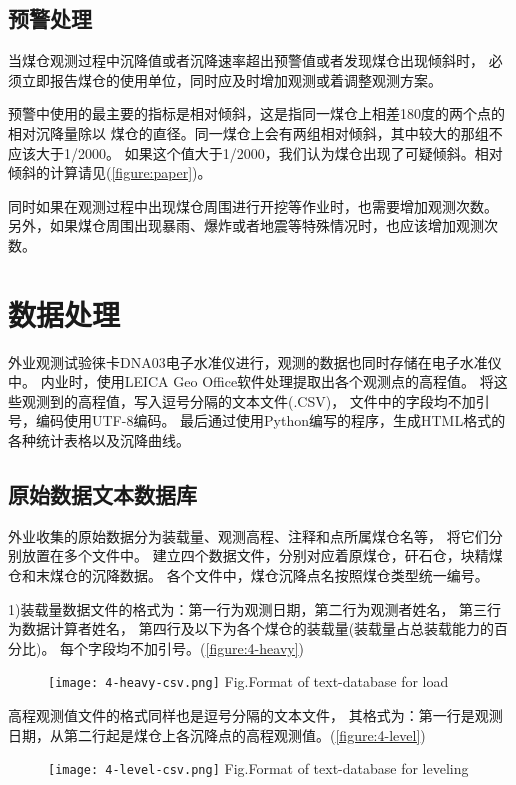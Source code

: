 \subsection{预警处理}
当煤仓观测过程中沉降值或者沉降速率超出预警值或者发现煤仓出现倾斜时，
必须立即报告煤仓的使用单位，同时应及时增加观测或着调整观测方案。

预警中使用的最主要的指标是相对倾斜，这是指同一煤仓上相差180度的两个点的相对沉降量除以
煤仓的直径。同一煤仓上会有两组相对倾斜，其中较大的那组不应该大于1/2000。
如果这个值大于1/2000，我们认为煤仓出现了可疑倾斜。相对倾斜的计算请见(\ref{figure:paper})。

同时如果在观测过程中出现煤仓周围进行开挖等作业时，也需要增加观测次数。
另外，如果煤仓周围出现暴雨、爆炸或者地震等特殊情况时，也应该增加观测次数。


\section{数据处理}
外业观测试验徕卡DNA03电子水准仪进行，观测的数据也同时存储在电子水准仪中。
内业时，使用LEICA Geo Office软件处理提取出各个观测点的高程值。
将这些观测到的高程值，写入逗号分隔的文本文件(.CSV)，
文件中的字段均不加引号，编码使用UTF-8编码。
最后通过使用Python编写的程序，生成HTML格式的各种统计表格以及沉降曲线。

\subsection{原始数据文本数据库}
外业收集的原始数据分为装载量、观测高程、注释和点所属煤仓名等，
将它们分别放置在多个文件中。
建立四个数据文件，分别对应着原煤仓，矸石仓，块精煤仓和末煤仓的沉降数据。
各个文件中，煤仓沉降点名按照煤仓类型统一编号。

1)装载量数据文件的格式为：第一行为观测日期，第二行为观测者姓名，
第三行为数据计算者姓名，
第四行及以下为各个煤仓的装载量(装载量占总装载能力的百分比)。
每个字段均不加引号。(\ref{figure:4-heavy})
\begin{figure}[!htbp]
   \centering
   \texttt{[image: 4-heavy-csv.png]}
			{Fig.}{Format of text-database for load}
\end{figure}

高程观测值文件的格式同样也是逗号分隔的文本文件，
其格式为：第一行是观测日期，从第二行起是煤仓上各沉降点的高程观测值。(\ref{figure:4-level})
\begin{figure}[!htbp]
   \centering
   \texttt{[image: 4-level-csv.png]}
			{Fig.}{Format of text-database for leveling}
\end{figure}

